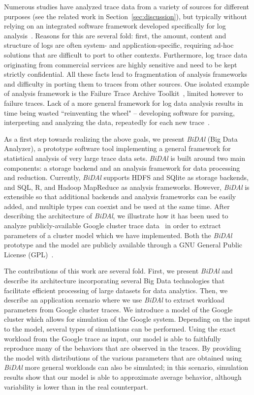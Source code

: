 \documentclass{article}
\begin{document}
Numerous studies have analyzed trace data from a variety of sources for different purposes (see the related work in Section~\ref{sec:discussion}), but typically without relying on an integrated software framework developed specifically for log analysis~\cite{Chen2012,Liu2012,Reiss2012}. Reasons for this are several fold: first, the amount, content and structure of logs are often system- and application-specific, requiring ad-hoc solutions that are difficult to port to other contexts. Furthermore, log trace data originating from commercial services are highly sensitive and need to be kept strictly confidential. All these facts lead to fragmentation of analysis frameworks and difficulty in porting them to traces from other sources. One isolated example of analysis framework is the Failure Trace Archive Toolkit~\cite{Javadi2013}, limited however to failure traces. Lack of a more general framework for log data analysis results in time being wasted ``reinventing the wheel"  -- developing software for parsing, interpreting and analyzing the data, repeatedly for each new trace~\cite{Javadi2013}. 

As a first step towards realizing the above goals, we present \emph{BiDAl} (Big Data Analyzer), a prototype software tool implementing a general framework for statistical analysis of very large trace data sets. \emph{BiDAl} is built around two main components: a storage backend and an analysis framework for data processing and reduction. Currently, \emph{BiDAl} supports HDFS and SQlite as storage backends, and SQL, R, and Hadoop MapReduce as analysis frameworks. However, \emph{BiDAl} is extensible so that additional backends and analysis frameworks can be easily added, and multiple types can coexist and be used at the same time. After describing the architecture of \emph{BiDAl}, we illustrate how it has been used to analyze publicly-available Google cluster trace data~\cite{googleData} in order to extract parameters of a cluster model which we have implemented. Both the \emph{BiDAl} prototype and the model are  publicly available through a GNU General Public License (GPL)~\cite{bidalCode}.

The contributions of this work are several fold. First, we present \emph{BiDAl} and describe its architecture incorporating several Big Data technologies that facilitate efficient processing of large datasets for data analytics. Then, we describe an application scenario where we use \emph{BiDAl} to extract workload parameters from Google cluster traces. We introduce a model of the Google cluster which allows for simulation of the Google system. Depending on the input to the model, several types of simulations can be performed. Using the exact workload from the Google trace as input, our model is able to faithfully reproduce many of the behaviors that are observed in the traces. By providing the model with distributions of the various parameters that are obtained using \emph{BiDAl} more general workloads can also be simulated; in this scenario, simulation results show that our model is able to approximate average behavior, although variability is lower than in the real counterpart. 
\end{document}
